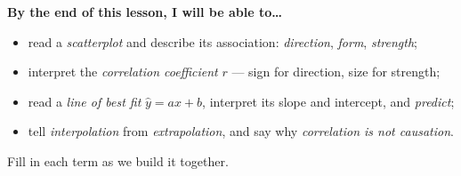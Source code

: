 \documentclass[10pt]{article}
\begin{document}

\vspace{0.10in}

\begin{objectivebox}
\textbf{By the end of this lesson, I will be able to\dots}
\begin{itemize}\setlength{\itemsep}{2pt}
  \item read a \emph{scatterplot} and describe its association: \emph{direction}, \emph{form}, \emph{strength};
  \item interpret the \emph{correlation coefficient} $r$ --- sign for direction, size for strength;
  \item read a \emph{line of best fit} $\hat y=ax+b$, interpret its slope and intercept, and \emph{predict};
  \item tell \emph{interpolation} from \emph{extrapolation}, and say why \emph{correlation is not causation}.
\end{itemize}
\end{objectivebox}

\vspace{0.05in}

\begin{vocabbox}
\small
Fill in each term as we build it together.
\par\vspace{2pt}   %
\end{vocabbox}
\end{document}
